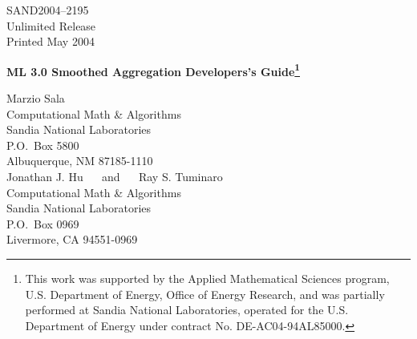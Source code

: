 \documentclass{article}[12pt]
\def\draft{%
\special{!userdict begin /bop-hook{gsave
200 30 translate 65 rotate
/Times-Roman findfont 216 scalefont setfont
0 0 moveto 0.9 setgray (DRAFT) show grestore}def end}
}
\begin{document}

\setcounter{page}{3}

\large


%
%
\begin{center}
SAND2004--2195 \\
Unlimited Release \\
Printed May 2004
\end{center}

\vspace{0.2in}

\begin{center}
{\Large {\bf ML 3.0 Smoothed Aggregation Developers's Guide\footnote{ This work was supported by
        the
        Applied Mathematical Sciences program, U.S. Department of Energy,
        Office of Energy Research, and was partially performed at 
        Sandia National
        Laboratories, operated for the U.S. Department of Energy under contract
        No. DE-AC04-94AL85000.} }}

\vspace*{0.8in}
Marzio  Sala \\
Computational Math \& Algorithms \\
Sandia National Laboratories\\
P.O.~Box 5800 \\
Albuquerque, NM 87185-1110\\[20pt]
Jonathan J. Hu $\quad$ and $\quad$
Ray S. Tuminaro \\
Computational Math \& Algorithms \\
Sandia National Laboratories\\
P.O.~Box 0969 \\
Livermore, CA 94551-0969\\


\vspace*{1in}

\end{center}
\end{document}
